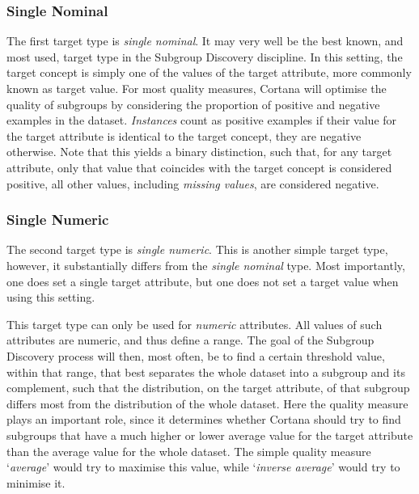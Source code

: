 \documentclass{article}
\begin{document}
\subsubsection{Single Nominal}
The first target type is \emph{single nominal}.
It may very well be the best known, and most used, target type in the Subgroup Discovery discipline.
In this setting, the target concept is simply one of the values of the target attribute, more commonly known as target value.
For most quality measures, Cortana will optimise the quality of subgroups by considering the proportion of positive and negative examples in the dataset.
\emph{Instances} count as positive examples if their value for the target attribute is identical to the target concept, they are negative otherwise.
Note that this yields a binary distinction, such that, for any target attribute, only that value that coincides with the target concept is considered positive, all other values, including \emph{missing values}, are considered negative.

\subsubsection{Single Numeric}
The second target type is \emph{single numeric}.
This is another simple target type, however, it substantially differs from the \emph{single nominal} type.
Most importantly, one does set a single target attribute, but one does not set a target value when using this setting.

This target type can only be used for \emph{numeric} attributes.
All values of such attributes are numeric, and thus define a range.
The goal of the Subgroup Discovery process will then, most often, be to find a certain threshold value, within that range, that best separates the whole dataset into a subgroup and its complement, such that the distribution, on the target attribute, of that subgroup differs most from the distribution of the whole dataset.
Here the quality measure plays an important role, since it determines whether Cortana should try to find subgroups that have a much higher or lower average value for the target attribute than the average value for the whole dataset.
The simple quality measure `\emph{average}'  would try to maximise this value, while `\emph{inverse average}' would try to minimise it.
\end{document}

